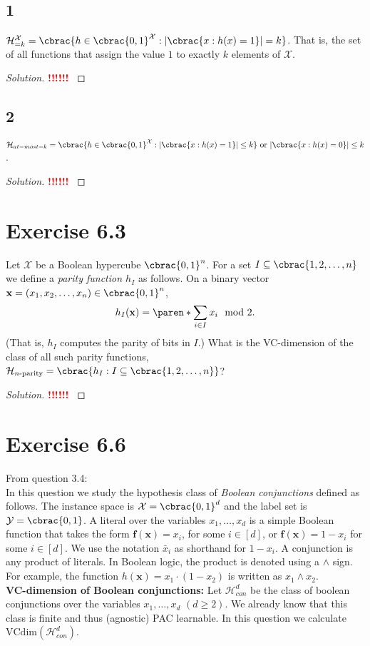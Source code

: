 \documentclass[10pt, a4paper, twoside]{amsart}
\DeclarePairedDelimiter\abs{\lvert}{\rvert}
\DeclarePairedDelimiter\cbrac\{\}
\DeclarePairedDelimiter\paren()
\newcommand{\cH}{\ensuremath{\mathcal{H}}}
\newcommand{\cX}{\ensuremath{\mathcal{X}}}
\newenvironment{solution}
               {\let\oldqedsymbol=\qedsymbol
                \renewcommand{\qedsymbol}{$\blacktriangleleft$}
                \begin{proof}[Solution]}
               {\end{proof}
                \renewcommand{\qedsymbol}{\oldqedsymbol}}
\newcommand{\TODO}{\textcolor{red}{\textbf{!!!!!! }}}
\begin{document}
\subsection*{1}
$\cH^{\cX}_{=k} = \cbrac{h \in \cbrac{0,1}^{\cX}: \abs{\cbrac{x: h(x) = 1}}=k}$. That is, the set of all functions that assign the value $1$ to exactly $k$ elements of $\cX$.
\begin{solution}
\TODO
\end{solution}
\subsection*{2}
$\cH_{at-most-k} = \cbrac{h \in \cbrac{0,1}^{\cX}: \abs{\cbrac{x: h(x) = 1}} \leq k} \text{ or }  \abs{\cbrac{x: h(x) = 0}}\leq k$.
\begin{solution}
\TODO
\end{solution}
\section*{Exercise 6.3}
Let $\cX$ be a Boolean hypercube $\cbrac{0,1}^n$. For a set $I \subseteq \cbrac{1,2,\ldots ,n}$ we define a \textit{parity function $h_I$} as follows. On a binary vector $\mathbf{x} = (x_1,x_2,\ldots ,x_n) \in \cbrac{0,1}^n$,
\begin{equation*}
  h_I(\mathbf{x}) = \paren*{\sum_{i \in I}x_i} \mod 2.
\end{equation*}
(That is, $h_I$ computes the parity of bits in $I$.) What is the VC-dimension of the class of all such parity functions, $\cH_{n\text{-parity}} = \cbrac{h_I:I \subseteq \cbrac{1,2, \dots ,n}}$?
\begin{solution}
\TODO
\end{solution}
\section*{Exercise 6.6}
From question 3.4: \\
In this question we study the hypothesis class of \textit{Boolean conjunctions} defined as follows. The instance space is $\cX = \cbrac{0,1}^d$ and the label set is $\mathcal{Y}=\cbrac{0,1}$. A literal over the variables $x_1, \ldots ,x_d$ is a simple Boolean function that takes the form $\mathbf{f}(\mathbf{x}) = x_i$, for some $i \in [d]$, or $\mathbf{f}(\mathbf{x}) = 1-x_i$ for some $i \in [d]$. We use the notation $\bar{x}_i$ as shorthand for $1-x_i$. A conjunction is any product of literals. In Boolean logic, the product is denoted using a $\land$ sign. For example, the function $h(\mathbf{x}) = x_1 \cdot (1-x_2)$ is written as $x_1 \land x_2$.\\
\textbf{VC-dimension of Boolean conjunctions:} Let $\cH^d_{con}$ be the class of boolean conjunctions over the variables $x_1, \ldots , x_d$ $(d \geq 2)$. We already know that this class is finite and thus (agnostic) PAC learnable. In this question we calculate $\text{VCdim}(\cH^d_{con})$.
\end{document}
